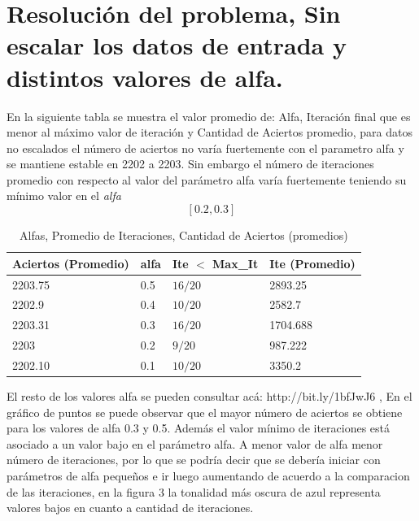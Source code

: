 \documentclass[8.5pt,twoside,twocolumn]{article}
\begin{document}
\section{ Resoluci\'on del problema, Sin escalar los datos de entrada y distintos valores de alfa.}
    En la siguiente tabla se muestra el valor promedio de: Alfa, Iteraci\'on final que
     es menor al m\'aximo valor de iteraci\'on y Cantidad de Aciertos promedio, para datos no
escalados el n\'umero de aciertos no var\'ia fuertemente con el parametro alfa y se mantiene 
estable en 2202 a 2203. Sin embargo el n\'umero de iteraciones promedio con respecto al valor del par\'ametro alfa
var\'ia fuertemente teniendo su m\'inimo valor en el \emph{alfa} $$ [0.2,0.3] $$ 
    
    \begin{table}[h]
        \small
        \caption{ Alfas, Promedio de Iteraciones, Cantidad de Aciertos (promedios) }
        \label{tbl:example}
        \begin{tabular*}{0.5\textwidth}{@{\extracolsep{\fill}}llll}
        \hline
        Aciertos (Promedio) & alfa & Ite $<$ Max\_It & Ite (Promedio)\\
        \hline
        2203.75 & 0.5 & $16/20$ &  2893.25\\
        2202.9  & 0.4 & $10/20$ & 2582.7  \\
        2203.31 & 0.3 & $16/20$ & 1704.688 \\
        2203   & 0.2 & $9/20$ & 987.222 \\
        2202.10  & 0.1 & $10/20$ & 3350.2 \\
        \hline
        \end{tabular*}
        \end{table}
El resto de los valores alfa se pueden consultar acá: http://bit.ly/1bfJwJ6 , 
En el gr\'afico de puntos se puede observar que el mayor n\'umero de aciertos se obtiene para los valores de alfa 0.3 y 0.5.
Adem\'as el valor m\'inimo de iteraciones est\'a asociado a un valor bajo en el par\'ametro alfa. A menor valor de alfa 
menor n\'umero de iteraciones, por lo que se podr\'ia decir que se deber\'ia iniciar con par\'ametros de alfa peque\~nos e ir luego
aumentando de acuerdo a la comparacion de las iteraciones, en la figura 3 la tonalidad m\'as oscura de azul representa valores bajos en 
cuanto a cantidad de iteraciones.
\end{document}
